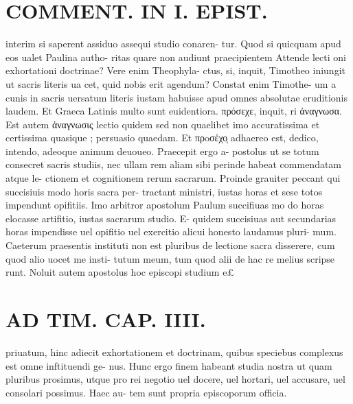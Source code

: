\documentclass{article}
\begin{document}
\begin{pages}
\section*{COMMENT. IN I. EPIST. }\pstart interim si saperent assiduo assequi studio conaren- tur. Quod si quicquam apud eos ualet Paulina autho- ritas quare non audiunt praecipientem Attende lecti oni exhortationi doctrinae? Vere enim Theophyla- ctus, si, inquit, Timotheo iniungit ut sacris literis ua cet, quid nobis erit agendum? Constat enim Timothe- um a cunis in sacris uersatum literis iustam habuisse apud omnes absolutae eruditionis laudem. Et Graeca Latinis multo sunt euidentiora. πρόσεχε, inquit, ri ἀναγνωσα. Est autem ἀναγνωσις lectio quidem sed non quaelibet imo accuratissima et certissima quasique ; persuasio quaedam. Et πρoσέχοͅ adhaereo est, dedico, intendo, adeoque animum deuoueo. Praecepit ergo a- postolus ut se totum consecret sacris studiis, nec ullam rem aliam sibi perinde habeat commendatam atque le- ctionem et cognitionem rerum sacrarum. Proinde grauiter peccant qui succisiuis modo horis sacra per- tractant ministri, iustas horas et sese totos impendunt opifitiis. Imo arbitror apostolum Paulum succifiuas mo do horas elocasse artifitio, iustas sacrarum studio. E- quidem succisiuas aut secundarias horas impendisse uel opifitio uel exercitio alicui honesto laudamus pluri- mum. Caeterum praesentis instituti non est pluribus de lectione sacra disserere, cum quod alio uocet me insti- tutum meum, tum quod alii de hac re melius scripse runt. Noluit autem apostolus hoc episcopi studium e£  \pend
\section*{AD TIM. CAP. IIII. }
\marginpar{[ p.146 ]}\pstart priuatum, hinc adiecit exhortationem et doctrinam, quibus speciebus complexus est omne inftituendi ge- nus. Hunc ergo finem habeant studia nostra ut quam pluribus prosimus, utque pro rei negotio uel docere, uel hortari, uel accusare, uel consolari possimus. Haec au- tem sunt propria episcoporum officia.  \pend
{}
{}

\end{pages}
\end{document}
